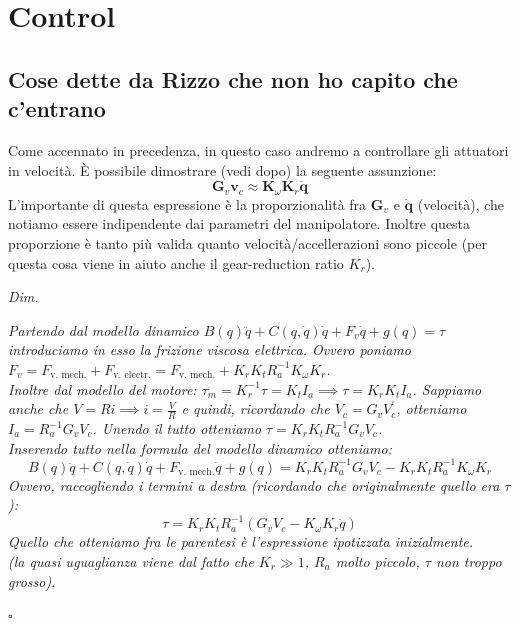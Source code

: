 


\chapter{Control}

\section{Cose dette da Rizzo che non ho capito che c'entrano}\label{appendix:decentralized_joint_control_velocity_controlled}

Come accennato in precedenza, in questo caso andremo a controllare gli attuatori in velocità.
È possibile dimostrare (vedi dopo) la seguente assunzione:
$$
\mathbf{G}_v\mathbf{v}_c \approx \mathbf{K}_\omega\mathbf{K}_r\mathbf{\dot{q}}
$$
L'importante di questa espressione è la proporzionalità fra $\mathbf{G}_v$ e  $\dot{\mathbf{q}}$ (velocità), che notiamo essere indipendente dai parametri del manipolatore. Inoltre questa proporzione è tanto più valida quanto velocità/accellerazioni sono piccole (per questa cosa viene in aiuto anche il gear-reduction ratio $K_r$).

\begin{mdframed}[leftmargin=15pt, rightmargin=15pt, leftline=false, rightline=false]
	\textit{Dim.}
	
	\textit{
		Partendo dal modello dinamico {\boldmath$B(q)\ddot{q} + C(q, \dot{q})\dot{q} + F_v\dot{q} + g(q) = \tau$} introduciamo in esso la frizione viscosa elettrica. Ovvero poniamo {\boldmath$F_v = F_\text{v. mech.} + F_\text{v. electr.} = F_\text{v. mech.} + K_rK_tR_a^{-1}K_\omega K_r$}. \\
		Inoltre dal modello del motore: 
		{\boldmath$\tau_m = K_r^{-1} \tau = K_t I_a \implies \tau = K_r K_t I_a$}. Sappiamo anche che $V = Ri \implies i = \frac{V}{R}$ e quindi, ricordando che {\boldmath$V_c = G_v V_c^{'}$}, otteniamo {\boldmath $I_a = R_a^{-1}G_v V_c$}. Unendo il tutto otteniamo {\boldmath $\tau = K_r K_t R_a^{-1}G_v V_c$}.\\
		Inserendo tutto nella formula del modello dinamico otteniamo:
		\boldmath
		$$
		B(q)\ddot{q} + C(q, \dot{q})\dot{q} + F_{\text{v. mech.}}\dot{q} + g(q) = K_r K_t R_a^{-1}G_v V_c - K_rK_tR_a^{-1}K_\omega K_r
		$$
		Ovvero, raccogliendo i termini a destra (ricordando che originalmente quello era $\tau$):
		\begin{equation}\label{eq:torque_command}
			\tau =  K_r K_t R_a^{-1}(G_v V_c - K_\omega K_r \dot{q})
		\end{equation}
		Quello che otteniamo fra le parentesi è l'espressione ipotizzata inizialmente.\\
		(la quasi uguaglianza viene dal fatto che $K_r \gg 1$, $R_a$ molto piccolo, $\tau$ non troppo grosso).
	}
	
	\raggedleft $\square$
\end{mdframed}












